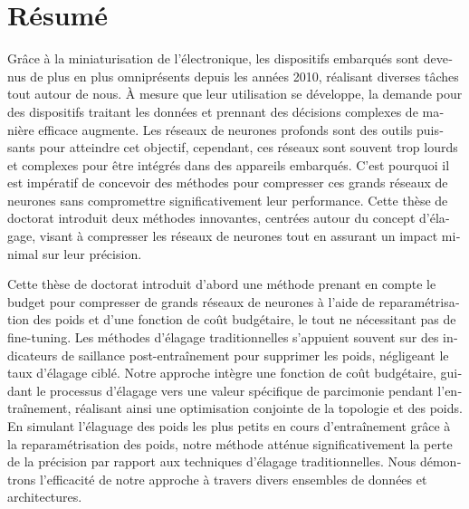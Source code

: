 \chapter*{Résumé}

\begin{otherlanguage}{french}

Grâce à la miniaturisation de l'électronique, les dispositifs embarqués sont
devenus de plus en plus omniprésents depuis les années 2010, réalisant diverses
tâches tout autour de nous. À mesure que leur utilisation se développe, la
demande pour des dispositifs traitant les données et prennant des décisions
complexes de manière efficace augmente. Les réseaux de neurones profonds sont
des outils puissants pour atteindre cet objectif, cependant, ces réseaux sont
souvent trop lourds et complexes pour être intégrés dans des appareils
embarqués. C'est pourquoi il est impératif de concevoir des méthodes pour
compresser ces grands réseaux de neurones sans compromettre significativement
leur performance. Cette thèse de doctorat introduit deux méthodes innovantes,
centrées autour du concept d'élagage, visant à compresser les réseaux de
neurones tout en assurant un impact minimal sur leur précision.

Cette thèse de doctorat introduit d'abord une méthode prenant en compte le
budget pour compresser de grands réseaux de neurones à l'aide de
reparamétrisation des poids et d'une fonction de coût budgétaire, le tout ne
nécessitant pas de fine-tuning. Les méthodes d'élagage traditionnelles
s'appuient souvent sur des indicateurs de saillance post-entraînement pour
supprimer les poids, négligeant le taux d'élagage ciblé. Notre approche intègre
une fonction de coût budgétaire, guidant le processus d'élagage vers une valeur
spécifique de parcimonie pendant l'entraînement, réalisant ainsi une
optimisation conjointe de la topologie et des poids. En simulant l'élaguage des
poids les plus petits en cours d'entraînement grâce à la reparamétrisation des
poids, notre méthode atténue significativement la perte de la précision par
rapport aux techniques d'élagage traditionnelles. Nous démontrons l'efficacité
de notre approche à travers divers ensembles de données et architectures.


\end{otherlanguage}
